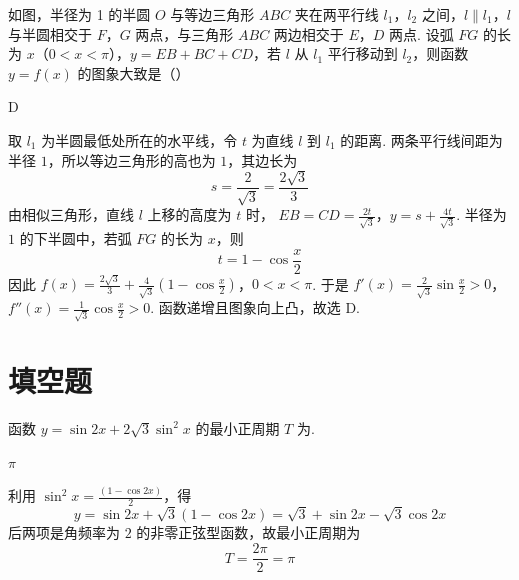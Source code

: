 \begin{problem}
如图，半径为 1 的半圆 \(O\) 与等边三角形 \(ABC\) 夹在两平行线 \(l_{1}\)，\(l_{2}\) 之间，\(l \parallel l_{1}\)，\(l\) 与半圆相交于 \(F\)，\(G\) 两点，与三角形 \(ABC\) 两边相交于 \(E\)，\(D\) 两点. 设弧 \(FG\) 的长为 \(x\)（\(0 < x < \pi\)），\(y = EB + BC + CD\)，若 \(l\) 从 \(l_{1}\) 平行移动到 \(l_{2}\)，则函数 \(y = f(x)\) 的图象大致是（\quad）


    {}
    {}
    {}
\end{problem}

\begin{answer}
D
\end{answer}

\begin{solution}
取 \(l_1\) 为半圆最低处所在的水平线，令 \(t\) 为直线 \(l\) 到 \(l_1\) 的距离. 两条平行线间距为半径 \(1\)，所以等边三角形的高也为 \(1\)，其边长为
\[
s=\frac{2}{\sqrt3}=\frac{2\sqrt3}{3}
\]
由相似三角形，直线 \(l\) 上移的高度为 \(t\) 时，
\(EB=CD=\frac{2t}{\sqrt3}\)，\(y=s+\frac{4t}{\sqrt3}\).
半径为 \(1\) 的下半圆中，若弧 \(FG\) 的长为 \(x\)，则
\[
t=1-\cos\frac{x}{2}
\]
因此
\(f(x)=\frac{2\sqrt3}{3} +\frac{4}{\sqrt3}\left(1-\cos\frac{x}{2}\right)\)，\(0<x<\pi\).
于是
\(f'(x)=\frac{2}{\sqrt3}\sin\frac{x}{2}>0\)，\(f''(x)=\frac{1}{\sqrt3}\cos\frac{x}{2}>0\).
函数递增且图象向上凸，故选 D.
\end{solution}

\section{填空题}

\begin{problem}
函数 \(y = \sin 2x + 2\sqrt{3}\sin^{2}x\) 的最小正周期 \(T\) 为\fillinblank{}.
\end{problem}

\begin{answer}
\(\pi\)
\end{answer}

\begin{solution}
利用 \(\sin^2x=\frac{(1-\cos2x)}{2}\)，得
\[
y=\sin2x+\sqrt3(1-\cos2x)
=\sqrt3+\sin2x-\sqrt3\cos2x
\]
后两项是角频率为 \(2\) 的非零正弦型函数，故最小正周期为
\[
T=\frac{2\pi}{2}=\pi
\]
\end{solution}

